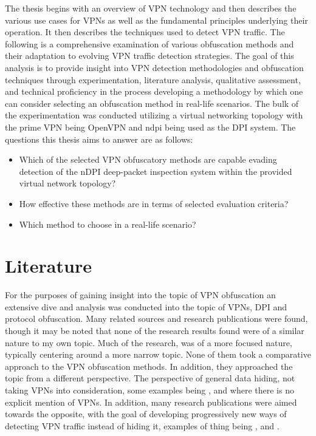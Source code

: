 \documentclass[12pt, fleqn, a4paper]{article}
\begin{document}
The thesis begins with an overview of VPN technology and then describes the various use cases for VPNs as well as the fundamental principles underlying their operation. It then describes the techniques used to detect VPN traffic. The following is a comprehensive examination of various obfuscation methods and their adaptation to evolving VPN traffic detection strategies. The goal of this analysis is to provide insight into VPN detection methodologies and obfuscation techniques through experimentation, literature analysis, qualitative assessment, and technical proficiency in the process developing a methodology by which one can consider selecting an obfuscation method in real-life scenarios. The bulk of the experimentation was conducted utilizing a virtual networking topology with the prime VPN being OpenVPN and ndpi being used as the DPI system. The questions this thesis aims to answer are as follows:
\begin{itemize}
  \item Which of the selected VPN obfuscatory methods are capable evading detection of the nDPI deep-packet inspection system within the provided virtual network topology?
  \item How effective these methods are in terms of selected evaluation criteria?
  \item Which method to choose in a real-life scenario?
\end{itemize}

\section{Literature}
For the purposes of gaining insight into the topic of VPN obfuscation an extensive dive and analysis was conducted into the topic of VPNs, DPI and protocol obfuscation. Many related sources and research publications were found, though it may be noted that none of the research results found were of a similar nature to my own topic. Much of the research, was of a more focused nature, typically centering around a more narrow topic. None of them took a comparative approach to the VPN obfuscation methods. In addition, they approached the topic from a different perspective. The perspective of general data hiding, not taking VPNs into consideration, some examples being \cite{Geneva}, \cite{Stega} and \cite{symtcp} where there is no explicit mention of VPNs. In addition, many research publications were aimed towards the opposite, with the goal of developing progressively new ways of detecting VPN traffic instead of hiding it, examples of thing being \cite{detection1}, \cite{detection2} and \cite{detection3}.
\end{document}
